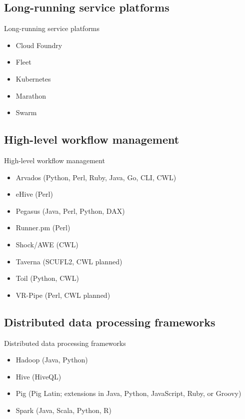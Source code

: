 \documentclass[xcolor=x11names,compress]{beamer}
\renewcommand{\(}{\begin{columns}}
\renewcommand{\)}{\end{columns}}
\newcommand{\<}[1]{\begin{column}{#1}}
\renewcommand{\>}{\end{column}}
\begin{document}
\subsection*{Long-running service platforms}
\begin{frame}{Long-running service platforms}
\pipesbackground
{}
\begin{itemize}
	\item Cloud Foundry
	\item Fleet
	\item Kubernetes
	\item Marathon
	\item Swarm
\end{itemize}
\end{frame}

\subsection*{High-level workflow management}
\begin{frame}{High-level workflow management}
\pipesbackground
{}
\begin{itemize}
	\item Arvados (Python, Perl, Ruby, Java, Go, CLI, CWL)
	\item eHive (Perl)
	\item Pegasus (Java, Perl, Python, DAX)
	\item Runner.pm (Perl)
	\item Shock/AWE (CWL)
	\item Taverna (SCUFL2, CWL planned)
	\item Toil (Python, CWL)
	\item VR-Pipe (Perl, CWL planned)
\end{itemize}
\end{frame}

\subsection*{Distributed data processing frameworks}
\begin{frame}{Distributed data processing frameworks}
\pipesbackground
{}
\begin{itemize}
	\item Hadoop (Java, Python)
	\item Hive (HiveQL)
	\item Pig (Pig Latin; extensions in Java, Python, JavaScript, Ruby, or Groovy)
	\item Spark (Java, Scala, Python, R)
\end{itemize}
\end{frame}
\end{document}
